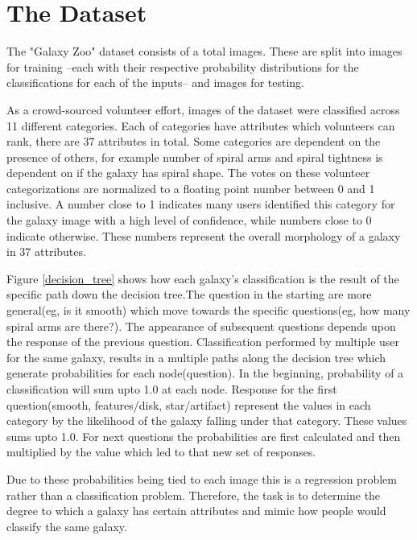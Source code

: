 \section{The Dataset}

The "Galaxy Zoo" dataset consists of a total  images. These are split into  images for training --each with their respective probability distributions for the classifications for each of the inputs-- and  images for testing.

As a crowd-sourced volunteer effort, images of the dataset were classified across 11 different categories. Each of categories have attributes which volunteers can rank, there are 37 attributes in total. Some categories are dependent on the presence of others, for example number of spiral arms and spiral tightness is dependent on if the galaxy has spiral shape. The votes on these volunteer categorizations are normalized to a floating point number between 0 and 1 inclusive. A number close to 1 indicates many users identified this category for the galaxy image with a high level of confidence, while numbers close to 0 indicate otherwise. These numbers represent the overall morphology of a galaxy in 37 attributes.

Figure \ref{decision_tree} shows how each galaxy's classification is the result of the specific path down the decision tree.The question in the starting are more general(eg, is it smooth) which move towards the specific questions(eg, how many spiral arms are there?). The appearance of subsequent questions depends upon the response of the previous question. Classification performed by multiple user for the same galaxy, results in a multiple paths along the decision tree which generate probabilities for each node(question). In the beginning, probability of a classification will sum upto 1.0 at each node. Response for the first question(smooth, features/disk, star/artifact) represent the values in each category by the likelihood of the galaxy falling under that category. These values sums upto 1.0. For next questions the probabilities are first calculated and then multiplied by the value which led to that new set of responses\cite{kaggledata}.   

Due to these probabilities being tied to each image this is a regression problem rather than a classification problem. Therefore, the task is to determine the degree to which a galaxy has certain attributes and mimic how people would classify the same galaxy.


